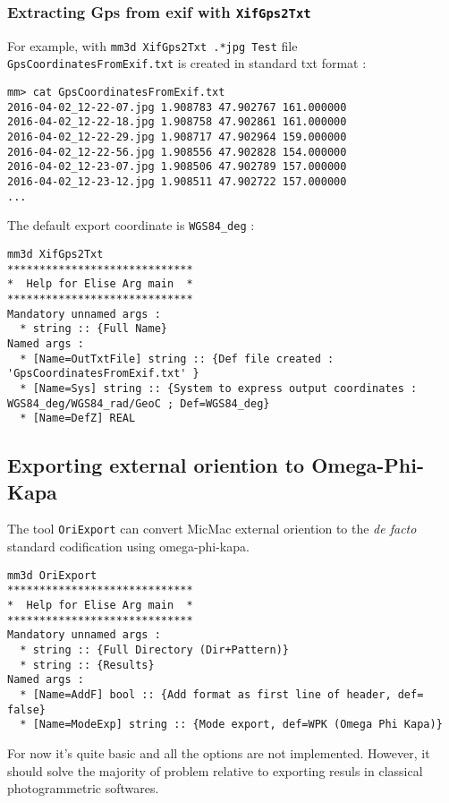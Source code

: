 \subsubsection{Extracting Gps from exif with {\tt XifGps2Txt}}

For example, with {\tt mm3d XifGps2Txt .*jpg Test}   file {\tt GpsCoordinatesFromExif.txt}
is created in standard txt format :

\begin{verbatim}
mm> cat GpsCoordinatesFromExif.txt
2016-04-02_12-22-07.jpg 1.908783 47.902767 161.000000 
2016-04-02_12-22-18.jpg 1.908758 47.902861 161.000000 
2016-04-02_12-22-29.jpg 1.908717 47.902964 159.000000 
2016-04-02_12-22-56.jpg 1.908556 47.902828 154.000000 
2016-04-02_12-23-07.jpg 1.908506 47.902789 157.000000 
2016-04-02_12-23-12.jpg 1.908511 47.902722 157.000000 
...
\end{verbatim}

The default export coordinate is {\tt WGS84\_deg} :


\begin{verbatim}
mm3d XifGps2Txt
*****************************
*  Help for Elise Arg main  *
*****************************
Mandatory unnamed args : 
  * string :: {Full Name}
Named args : 
  * [Name=OutTxtFile] string :: {Def file created : 'GpsCoordinatesFromExif.txt' }
  * [Name=Sys] string :: {System to express output coordinates : WGS84_deg/WGS84_rad/GeoC ; Def=WGS84_deg}
  * [Name=DefZ] REAL
\end{verbatim}

\subsection{Exporting external oriention to Omega-Phi-Kapa}

The tool {\tt OriExport} can convert MicMac external oriention to the \emph{de facto} standard
codification using omega-phi-kapa.


\begin{verbatim}
mm3d OriExport
*****************************
*  Help for Elise Arg main  *
*****************************
Mandatory unnamed args :
  * string :: {Full Directory (Dir+Pattern)}
  * string :: {Results}
Named args :
  * [Name=AddF] bool :: {Add format as first line of header, def= false}
  * [Name=ModeExp] string :: {Mode export, def=WPK (Omega Phi Kapa)}
\end{verbatim}

For now it's quite basic and all the options are not implemented. However, it should solve the
majority of problem relative to exporting resuls in classical photogrammetric softwares.

